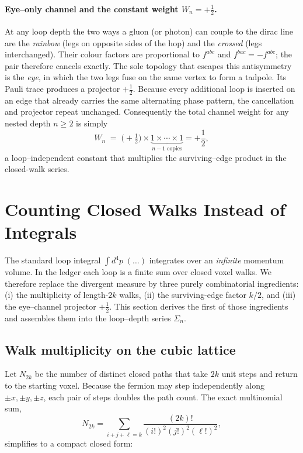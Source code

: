 \documentclass[11pt]{article}
\begin{document}
\paragraph{Eye–only channel and the constant weight \(W_{n}=+\tfrac12\).}
At any loop depth the two ways a gluon (or photon) can couple to the
dirac line are the \emph{rainbow\/} (legs on opposite sides of the hop)
and the \emph{crossed\/} (legs interchanged).  Their colour factors are
proportional to \(f^{abc}\) and \(f^{bac}=-f^{abc}\); the pair therefore
cancels exactly.  The sole topology that escapes this
antisymmetry is the \emph{eye}, in which the two legs fuse on the same
vertex to form a tadpole.  Its Pauli trace produces a projector
\(+\tfrac12\).  Because every additional loop is inserted on an edge
that already carries the same alternating phase pattern, the cancellation
and projector repeat unchanged.  Consequently the total channel weight
for any nested depth \(n\ge 2\) is simply
\[
   W_{n}
     \;=\;
     \bigl(+\tfrac12\bigr)\times
     \underbrace{1\times\cdots\times 1}_{\text{$n-1$ copies}}
     = +\frac12,
\]
a loop–independent constant that multiplies the surviving–edge product
in the closed-walk series.

\section{Counting Closed Walks Instead of Integrals}\label{sec:walks}

The standard loop integral
\(\int d^4p\;(\ldots)\) integrates over an \emph{infinite} momentum
volume.  In the ledger each loop is a finite sum over closed voxel
walks.  We therefore replace the divergent measure by three purely
combinatorial ingredients: (i) the multiplicity of length-$2k$ walks,
(ii) the surviving-edge factor \(k/2\), and (iii) the eye–channel
projector \(+\frac12\).  This section derives the first of those
ingredients and assembles them into the loop–depth series
\(\Sigma_{n}\).

\subsection{Walk multiplicity on the cubic lattice}

Let \(N_{2k}\) be the number of distinct closed paths that take \(2k\)
unit steps and return to the starting voxel.  Because the fermion may
step independently along \(\pm x,\pm y,\pm z\), each pair of steps
doubles the path count.  The exact multinomial sum,
\[
N_{2k}=\!\!\sum_{i+j+\ell=k}\frac{(2k)!}{(i!)^2 (j!)^2 (\ell!)^2},
\]
simplifies to a compact closed form:
\end{document}
